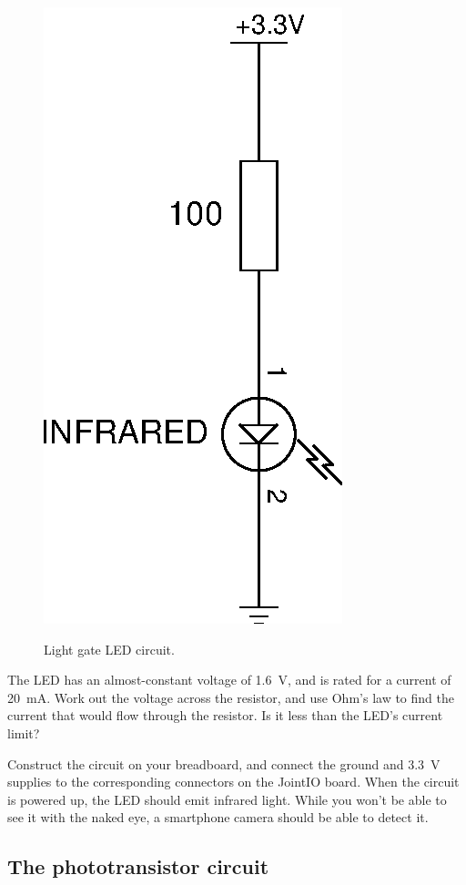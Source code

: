 \documentclass{article}
\begin{document}
\begin{figure}[h]
\centering
\includegraphics[width=.5\textwidth]{assets/fig/schem/ir-led}
\label{fig:schem:ir-led}
\caption{Light gate LED circuit.}
\end{figure}

The LED has an almost-constant voltage of \SI{1.6}{\volt}, and is rated for a
current of \SI{20}{\milli\ampere}. Work out the voltage across the resistor,
and use Ohm's law to find the current that would flow through the resistor. Is
it less than the LED's current limit?

Construct the circuit on your breadboard, and connect the ground and
\SI{3.3}{\volt} supplies to the corresponding connectors on the JointIO board.
When the circuit is powered up, the LED should emit infrared light. While you
won't be able to see it with the naked eye, a smartphone camera should be able
to detect it.

\subsection{The phototransistor circuit}



\end{document}
